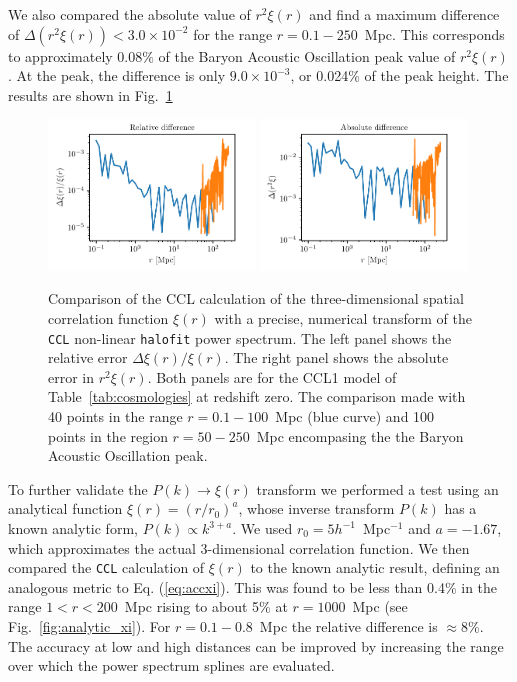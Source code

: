 \documentclass[\docopts]{\docclass}
\newcommand{\ccl}{{\tt CCL}\xspace}
\newcommand{\halofit}{{\tt halofit}\xspace}
\begin{document}
We also compared the absolute value of $r^2 \xi(r)$ and find a maximum difference of $\Delta (r^2 \xi(r)) < 3.0 \times 10^{-2}$ for the range $r = 0.1 - 250$~Mpc. This corresponds to approximately $0.08\%$ of the Baryon Acoustic Oscillation peak value of $r^2 \xi(r)$. At the peak, the difference is only $9.0 \times 10^{-3}$, or 0.024\% of the peak height. The results are shown in Fig.~\ref{fig:benchmark_xi}
%
\begin{figure}
\centering
\includegraphics[width=0.49\textwidth]{benchmark_xi_rel}
\includegraphics[width=0.49\textwidth]{benchmark_xi_abs} 
\caption{Comparison of the CCL calculation of the three-dimensional spatial correlation function $\xi(r)$ with a precise, numerical transform of the \ccl non-linear \halofit power spectrum. The left panel shows the relative error $\Delta \xi(r) / \xi(r)$. The right panel shows the absolute error in $r^2 \xi(r)$. Both panels are for the CCL1 model of Table~\ref{tab:cosmologies} at redshift zero. The comparison made with 40 points in the range $r = 0.1 - 100$~Mpc (blue curve) and 100 points in the region $r = 50 - 250$~Mpc encompasing the the Baryon Acoustic Oscillation peak.}
\label{fig:benchmark_xi}
\end{figure}
%

To further validate the $P(k) \to \xi(r)$ transform we performed a test using an analytical function $\xi(r) = (r / r_0)^a$, whose inverse transform $P(k)$ has a known analytic form, $P(k) \propto k^{3+a}$. We used $r_0 = 5 h^{-1}$~Mpc$^{-1}$ and $a = -1.67$, which approximates the actual 3-dimensional correlation function.  We then compared the \ccl calculation of $\xi(r)$ to the known analytic result, defining an analogous metric to Eq. (\ref{eq:accxi}). This was found to be less than 0.4\% in the range $1 < r < 200$~Mpc rising to about 5\% at $r = 1000$~Mpc (see Fig.~\ref{fig:analytic_xi}). For $r=0.1-0.8$~Mpc the relative difference is $\approx$8\%. The accuracy at low and high distances can be improved by increasing the range over which the power spectrum splines are evaluated. 
\end{document}
